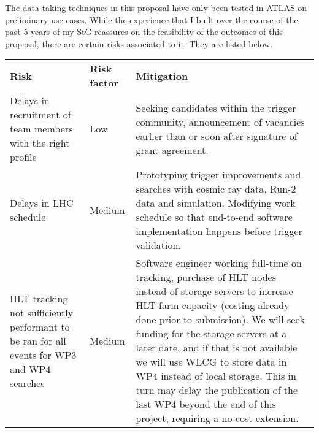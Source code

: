 The data-taking techniques in this proposal have only been tested in ATLAS on preliminary use cases. 
While the experience that I built over the course of the past 5 years of my StG reassures on the feasibility of the outcomes of this proposal, there are certain risks associated to it. %
They are listed below.  
\begin{center}%
\begin{tabular}{p{60mm}p{}p{85mm}}
\toprule
\midrule
\textbf{Risk} & \textbf{Risk factor} &  \textbf{Mitigation} \\
Delays in recruitment of team members with the right profile & Low & Seeking candidates within the trigger community, announcement of vacancies earlier than or soon after signature of grant agreement. \\
Delays in LHC schedule & Medium & Prototyping trigger improvements and searches with cosmic ray data, Run-2 data and simulation. Modifying work schedule so that end-to-end software implementation happens before trigger validation.\\
HLT tracking not sufficiently performant to be ran for all events for WP3 and WP4 searches & Medium & Software engineer working full-time on tracking, purchase of HLT nodes instead of storage servers to increase HLT farm capacity (costing already done prior to submission). We will seek funding for the storage servers at a later date, and if that is not available we will use WLCG to store data in WP4 instead of local storage. This in turn may delay the publication of the last WP4 beyond the end of this project, requiring a no-cost extension. %
\\
\bottomrule
\end{tabular}
\end{center}

\clearpage
\begingroup

    \linespread{0.9}\selectfont

\endgroup
  
